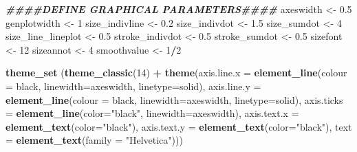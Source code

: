 \documentclass[
]{article}
\newenvironment{Shaded}{\begin{snugshade}}{\end{snugshade}}
\newcommand{\AttributeTok}[1]{\textcolor[rgb]{0.13,0.29,0.53}{#1}}
\newcommand{\DecValTok}[1]{\textcolor[rgb]{0.00,0.00,0.81}{#1}}
\newcommand{\DocumentationTok}[1]{\textcolor[rgb]{0.56,0.35,0.01}{\textbf{\textit{#1}}}}
\newcommand{\FloatTok}[1]{\textcolor[rgb]{0.00,0.00,0.81}{#1}}
\newcommand{\FunctionTok}[1]{\textcolor[rgb]{0.13,0.29,0.53}{\textbf{#1}}}
\newcommand{\NormalTok}[1]{#1}
\newcommand{\OtherTok}[1]{\textcolor[rgb]{0.56,0.35,0.01}{#1}}
\newcommand{\SpecialCharTok}[1]{\textcolor[rgb]{0.81,0.36,0.00}{\textbf{#1}}}
\newcommand{\StringTok}[1]{\textcolor[rgb]{0.31,0.60,0.02}{#1}}
\begin{document}
\begin{Shaded}
\begin{Highlighting}[]
\DocumentationTok{\#\#\#\#DEFINE GRAPHICAL PARAMETERS\#\#\#\#}
\NormalTok{axeswidth }\OtherTok{\textless{}{-}} \FloatTok{0.5}
\NormalTok{genplotwidth }\OtherTok{\textless{}{-}} \DecValTok{1}
\NormalTok{size\_indivline }\OtherTok{\textless{}{-}} \FloatTok{0.2}
\NormalTok{size\_indivdot }\OtherTok{\textless{}{-}} \FloatTok{1.5}
\NormalTok{size\_sumdot }\OtherTok{\textless{}{-}} \DecValTok{4}
\NormalTok{size\_line\_lineplot }\OtherTok{\textless{}{-}} \FloatTok{0.5}
\NormalTok{stroke\_indivdot }\OtherTok{\textless{}{-}} \FloatTok{0.5}
\NormalTok{stroke\_sumdot }\OtherTok{\textless{}{-}} \FloatTok{0.5}
\NormalTok{sizefont }\OtherTok{\textless{}{-}} \DecValTok{12}
\NormalTok{sizeannot }\OtherTok{\textless{}{-}} \DecValTok{4}
\NormalTok{smoothvalue }\OtherTok{\textless{}{-}} \DecValTok{1}\SpecialCharTok{/}\DecValTok{2}

\FunctionTok{theme\_set}\NormalTok{ (}\FunctionTok{theme\_classic}\NormalTok{(}\DecValTok{14}\NormalTok{) }\SpecialCharTok{+} \FunctionTok{theme}\NormalTok{(}\AttributeTok{axis.line.x =} \FunctionTok{element\_line}\NormalTok{(}\AttributeTok{colour =} \StringTok{\textquotesingle{}black\textquotesingle{}}\NormalTok{, }\AttributeTok{linewidth=}\NormalTok{axeswidth, }\AttributeTok{linetype=}\StringTok{\textquotesingle{}solid\textquotesingle{}}\NormalTok{),}
                                     \AttributeTok{axis.line.y =} \FunctionTok{element\_line}\NormalTok{(}\AttributeTok{colour =} \StringTok{\textquotesingle{}black\textquotesingle{}}\NormalTok{, }\AttributeTok{linewidth=}\NormalTok{axeswidth, }\AttributeTok{linetype=}\StringTok{\textquotesingle{}solid\textquotesingle{}}\NormalTok{),}
                                     \AttributeTok{axis.ticks =} \FunctionTok{element\_line}\NormalTok{(}\AttributeTok{color=}\StringTok{"black"}\NormalTok{, }\AttributeTok{linewidth=}\NormalTok{axeswidth),}
                                     \AttributeTok{axis.text.x =} \FunctionTok{element\_text}\NormalTok{(}\AttributeTok{color=}\StringTok{"black"}\NormalTok{),}
                                     \AttributeTok{axis.text.y =} \FunctionTok{element\_text}\NormalTok{(}\AttributeTok{color=}\StringTok{"black"}\NormalTok{),}
                                     \AttributeTok{text =} \FunctionTok{element\_text}\NormalTok{(}\AttributeTok{family =} \StringTok{"Helvetica"}\NormalTok{)))}


\end{Highlighting}
\end{Shaded}
\end{document}
